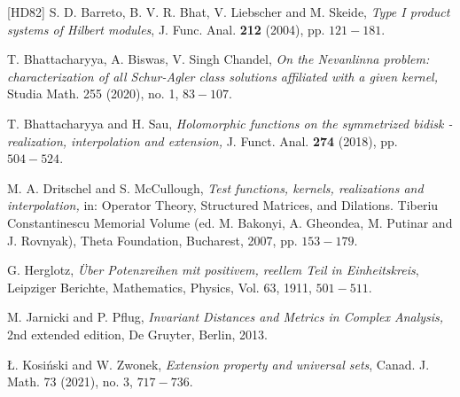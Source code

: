 \documentclass[12pt]{amsart}
\theoremstyle{definition}
\numberwithin{equation}{section}
\begin{document}
\begin{thebibliography}{[HD82]}
 S. D. Barreto, B. V. R. Bhat, V. Liebscher and M. Skeide, \textit{Type I product systems of Hilbert modules}, J. Func. Anal. \textbf{212} (2004), pp. $121-181$.


 T. Bhattacharyya, A. Biswas, V. Singh Chandel, \textit{On the Nevanlinna problem: characterization of all Schur-Agler class solutions affiliated with a given kernel,} Studia Math. 255 (2020), no. 1, $83-107$.



 T. Bhattacharyya and H. Sau, \textit{Holomorphic functions on the symmetrized bidisk - realization, interpolation and extension,}  J. Funct. Anal. \textbf{274} (2018), pp. $504-524$.



 M. A. Dritschel and S. McCullough, \textit{Test functions, kernels, realizations and interpolation,} in: Operator Theory, Structured Matrices, and Dilations. Tiberiu Constantinescu Memorial Volume (ed. M. Bakonyi, A. Gheondea, M. Putinar and J. Rovnyak), Theta Foundation, Bucharest, 2007, pp. $153 -179$.

 G. Herglotz,	\textit{\"Uber Potenzreihen mit positivem, reellem Teil in Einheitskreis}, Leipziger Berichte, Mathematics, Physics, Vol. 63, 1911, $501-511$.



 M. Jarnicki and P. Pflug, \textit{Invariant Distances and Metrics in Complex Analysis,} 2nd extended edition, De Gruyter, Berlin, 2013.

 Ł. Kosiński and W. Zwonek, \textit{Extension property and universal sets}, Canad. J. Math. 73 (2021), no. 3, $717-736$.



\end{thebibliography}
\end{document}
